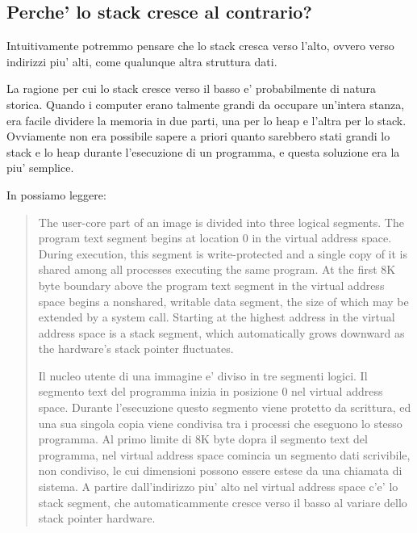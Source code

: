 \subsection{Perche' lo stack cresce al contrario?}
\label{stack_grow_backwards}

Intuitivamente potremmo pensare che lo stack cresca verso l'alto, ovvero verso indirizzi piu' alti, come qualunque altra struttura dati.

La ragione per cui lo stack cresce verso il basso e' probabilmente di natura storica.
Quando i computer erano talmente grandi da occupare un'intera stanza, era facile dividere la memoria in due parti, una per lo 
\gls{heap} e l'altra per lo stack.
Ovviamente non era possibile sapere a priori quanto sarebbero stati grandi lo stack e lo \gls{heap} durante l'esecuzione di un programma,
e questa soluzione era la piu' semplice.



In \RitchieThompsonUNIX possiamo leggere:

\begin{framed}
\begin{quotation}
The user-core part of an image is divided into three logical segments.
The program text segment begins at location 0 in the virtual address space.
During execution, this segment is write-protected and a single copy of it is shared among all processes executing the same program.
At the first 8K byte boundary above the program text segment in the virtual address space begins a nonshared, writable data segment, the size of which may be extended by a system call.
Starting at the highest address in the virtual address space is a stack segment, which automatically grows downward as the hardware's stack pointer fluctuates.

Il nucleo utente di una immagine e' diviso in tre segmenti logici.
Il segmento text del programma inizia in posizione 0 nel virtual address space.
Durante l'esecuzione questo segmento viene protetto da scrittura, ed una sua singola copia viene condivisa tra i processi che eseguono lo stesso programma.
Al primo limite di 8K byte dopra il segmento text del programma, nel virtual address space comincia un segmento dati scrivibile, non condiviso, le cui dimensioni possono essere estese da una chiamata di sistema.
A partire dall'indirizzo piu' alto nel virtual address space c'e' lo stack segment, che automaticammente cresce verso il basso al variare dello stack pointer hardware.
\end{quotation}
\end{framed}

